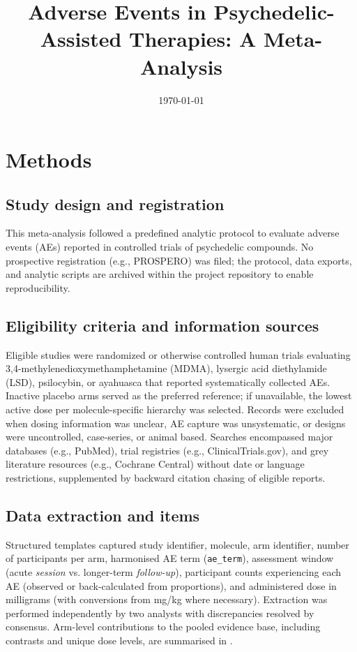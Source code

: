 \documentclass[11pt,a4paper]{article}
\title{Adverse Events in Psychedelic-Assisted Therapies: A Meta-Analysis}
\author{}
\date{\today}
\begin{document}
\maketitle

\begin{abstract}
\end{abstract}

\section{Methods}
\subsection{Study design and registration}
This meta-analysis followed a predefined analytic protocol to evaluate adverse events (AEs) reported in controlled trials of psychedelic compounds. No prospective registration (e.g., PROSPERO) was filed; the protocol, data exports, and analytic scripts are archived within the project repository to enable reproducibility.

\subsection{Eligibility criteria and information sources}
Eligible studies were randomized or otherwise controlled human trials evaluating 3,4-methylenedioxymethamphetamine (MDMA), lysergic acid diethylamide (LSD), psilocybin, or ayahuasca that reported systematically collected AEs. Inactive placebo arms served as the preferred reference; if unavailable, the lowest active dose per molecule-specific hierarchy was selected. Records were excluded when dosing information was unclear, AE capture was unsystematic, or designs were uncontrolled, case-series, or animal based. Searches encompassed major databases (e.g., PubMed), trial registries (e.g., ClinicalTrials.gov), and grey literature resources (e.g., Cochrane Central) without date or language restrictions, supplemented by backward citation chasing of eligible reports.

\subsection{Data extraction and items}
Structured templates captured study identifier, molecule, arm identifier, number of participants per arm, harmonised AE term (\texttt{ae\_term}), assessment window (acute \emph{session} vs. longer-term \emph{follow-up}), participant counts experiencing each AE (observed or back-calculated from proportions), and administered dose in milligrams (with conversions from mg/kg where necessary). Extraction was performed independently by two analysts with discrepancies resolved by consensus. Arm-level contributions to the pooled evidence base, including contrasts and unique dose levels, are summarised in .
\end{document}
